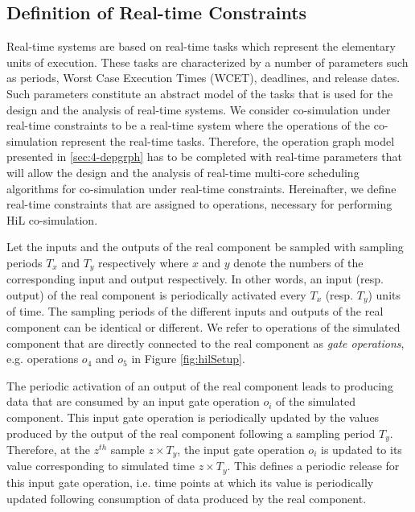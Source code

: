 \subsection{Definition of Real-time Constraints}

Real-time systems are based on real-time tasks which represent the elementary units of execution. These tasks are characterized by a number of parameters such as periods, Worst Case Execution Times (WCET), deadlines, and release dates. Such parameters constitute an abstract model of the tasks that is used for the design and the analysis of real-time systems. We consider co-simulation under real-time constraints to be a real-time system where the operations of the co-simulation represent the real-time tasks. Therefore, the operation graph model presented in \ref{sec:4-depgrph} has to be completed with real-time parameters that will allow the design and the analysis of real-time multi-core scheduling algorithms for co-simulation under real-time constraints. Hereinafter, we define real-time constraints that are assigned to operations, necessary for performing HiL co-simulation.

Let the inputs and the outputs of the real component be sampled with sampling periods $T_{x}$  and $T_{y}$ respectively where $x$ and $y$ denote the numbers of the corresponding input and output respectively. In other words, an input (resp. output) of the real component is periodically activated every $T_{x}$ (resp. $T_{y}$) units of time. The sampling periods of the different inputs and outputs of the real component can be identical or different.%
 We refer to operations of the simulated component that are directly connected to the real component as \textit{gate operations}, e.g. operations $o_4$ and $o_5$ in Figure \ref{fig:hilSetup}.  

The periodic activation of an output of the real component leads to producing data that are consumed by an input gate operation $o_i$ of the simulated component. This input gate operation is periodically updated by the values produced by the output of the real component following a sampling period $T_{y}$. Therefore, at the $z^{th}$ sample $z \times T_{y}$, the input gate operation $o_i$ is updated to its value corresponding to simulated time $z \times T_{y}$. This defines a periodic release for this input gate operation, i.e. time points at which its value is periodically updated following consumption of data produced by the real component.

